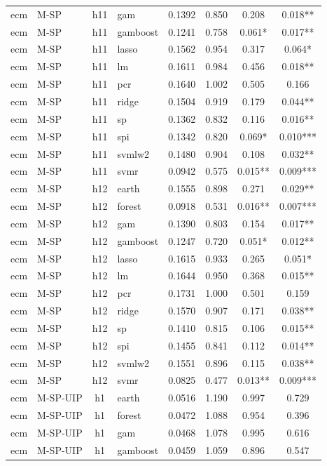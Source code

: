 \begin{ThreePartTable}
\begin{longtable}[t]{llclcccc}
ecm & M-SP & h11 & gam & 0.1392 & 0.850 & 0.208 & 0.018**\\
ecm & M-SP & h11 & gamboost & 0.1241 & 0.758 & 0.061* & 0.017**\\
ecm & M-SP & h11 & lasso & 0.1562 & 0.954 & 0.317 & 0.064*\\
ecm & M-SP & h11 & lm & 0.1611 & 0.984 & 0.456 & 0.018**\\
ecm & M-SP & h11 & pcr & 0.1640 & 1.002 & 0.505 & 0.166\\
ecm & M-SP & h11 & ridge & 0.1504 & 0.919 & 0.179 & 0.044**\\
ecm & M-SP & h11 & sp & 0.1362 & 0.832 & 0.116 & 0.016**\\
ecm & M-SP & h11 & spi & 0.1342 & 0.820 & 0.069* & 0.010***\\
ecm & M-SP & h11 & svmlw2 & 0.1480 & 0.904 & 0.108 & 0.032**\\
ecm & M-SP & h11 & svmr & 0.0942 & 0.575 & 0.015** & 0.009***\\
\addlinespace
ecm & M-SP & h12 & earth & 0.1555 & 0.898 & 0.271 & 0.029**\\
ecm & M-SP & h12 & forest & 0.0918 & 0.531 & 0.016** & 0.007***\\
ecm & M-SP & h12 & gam & 0.1390 & 0.803 & 0.154 & 0.017**\\
ecm & M-SP & h12 & gamboost & 0.1247 & 0.720 & 0.051* & 0.012**\\
ecm & M-SP & h12 & lasso & 0.1615 & 0.933 & 0.265 & 0.051*\\
ecm & M-SP & h12 & lm & 0.1644 & 0.950 & 0.368 & 0.015**\\
ecm & M-SP & h12 & pcr & 0.1731 & 1.000 & 0.501 & 0.159\\
ecm & M-SP & h12 & ridge & 0.1570 & 0.907 & 0.171 & 0.038**\\
ecm & M-SP & h12 & sp & 0.1410 & 0.815 & 0.106 & 0.015**\\
ecm & M-SP & h12 & spi & 0.1455 & 0.841 & 0.112 & 0.014**\\
ecm & M-SP & h12 & svmlw2 & 0.1551 & 0.896 & 0.115 & 0.038**\\
ecm & M-SP & h12 & svmr & 0.0825 & 0.477 & 0.013** & 0.009***\\
\addlinespace
ecm & M-SP-UIP & h1 & earth & 0.0516 & 1.190 & 0.997 & 0.729\\
ecm & M-SP-UIP & h1 & forest & 0.0472 & 1.088 & 0.954 & 0.396\\
ecm & M-SP-UIP & h1 & gam & 0.0468 & 1.078 & 0.995 & 0.616\\
ecm & M-SP-UIP & h1 & gamboost & 0.0459 & 1.059 & 0.896 & 0.547\\

\end{longtable}
\end{ThreePartTable}
